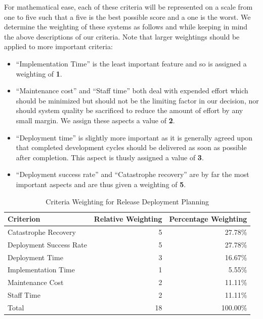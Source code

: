 \documentclass[12pt]{article}
\begin{document}
For mathematical ease, each of these criteria will be represented on a scale from one to five such that a five is the best possible score and a one is the worst. We determine the weighting of these systems as follows and while keeping in mind the above descriptions of our criteria. Note that larger weightings should be applied to more important criteria:
\begin{itemize}
\item ``Implementation Time'' is the least important feature and so is assigned a weighting of {\bf 1}.
\item ``Maintenance cost'' and ``Staff time'' both deal with expended effort which should be minimized but should not be the limiting factor in our decision, nor should system quality be sacrificed to reduce the amount of effort by any small margin. We assign these aspects a value of {\bf 2}.
\item ``Deployment time'' is slightly more important as it is generally agreed upon that completed development cycles should be delivered as soon as possible after completion. This aspect is thusly assigned a value of {\bf 3}.
\item ``Deployment success rate'' and ``Catastrophe recovery'' are by far the most important aspects and are thus given a weighting of {\bf 5}.
\end{itemize}

\begin{table}[ht]
\caption{Criteria Weighting for Release Deployment Planning}
\label{tbl:weighting-rdp}
\centering
\begin{tabular}{|l|r|r|}
    \hline
    Criterion & Relative Weighting & Percentage Weighting \\
    \hline
    \hline
    Catastrophe Recovery    &  5 &  27.78\% \\
    Deployment Success Rate &  5 &  27.78\% \\
    Deployment Time         &  3 &  16.67\% \\
    Implementation Time     &  1 &   5.55\% \\
    Maintenance Cost        &  2 &  11.11\% \\
    Staff Time              &  2 &  11.11\% \\
    \hline
    \hline
    Total                   & 18 & 100.00\% \\
    \hline
\end{tabular}
\end{table}
\end{document}
